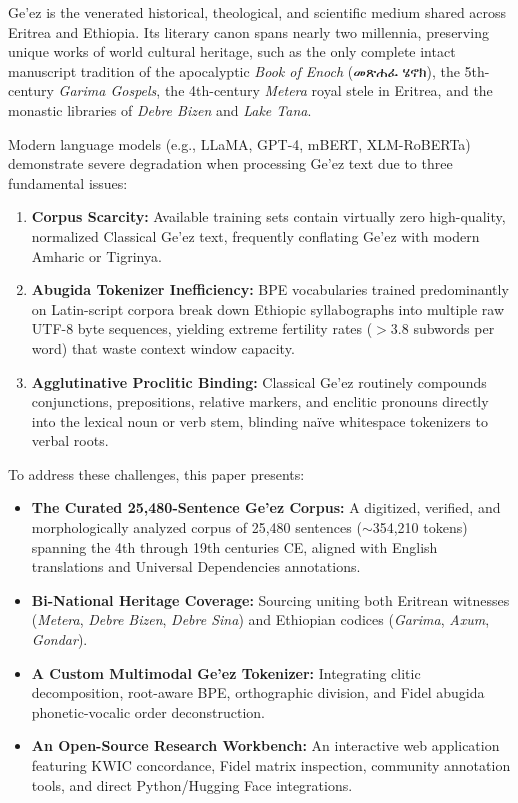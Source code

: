 \documentclass[11pt,a4paper]{article}
\begin{document}
Ge'ez is the venerated historical, theological, and scientific medium shared across Eritrea and Ethiopia. Its literary canon spans nearly two millennia, preserving unique works of world cultural heritage, such as the only complete intact manuscript tradition of the apocalyptic \textit{Book of Enoch} (መጽሐፈ ሄኖክ), the 5th-century \textit{Garima Gospels}, the 4th-century \textit{Metera} royal stele in Eritrea, and the monastic libraries of \textit{Debre Bizen} and \textit{Lake Tana}.

Modern language models (e.g., LLaMA, GPT-4, mBERT, XLM-RoBERTa) demonstrate severe degradation when processing Ge'ez text due to three fundamental issues:
\begin{enumerate}
    \item \textbf{Corpus Scarcity:} Available training sets contain virtually zero high-quality, normalized Classical Ge'ez text, frequently conflating Ge'ez with modern Amharic or Tigrinya.
    \item \textbf{Abugida Tokenizer Inefficiency:} BPE vocabularies trained predominantly on Latin-script corpora break down Ethiopic syllabographs into multiple raw UTF-8 byte sequences, yielding extreme fertility rates ($>3.8$ subwords per word) that waste context window capacity.
    \item \textbf{Agglutinative Proclitic Binding:} Classical Ge'ez routinely compounds conjunctions, prepositions, relative markers, and enclitic pronouns directly into the lexical noun or verb stem, blinding naïve whitespace tokenizers to verbal roots.
\end{enumerate}

To address these challenges, this paper presents:
\begin{itemize}
    \item \textbf{The Curated 25,480-Sentence Ge'ez Corpus:} A digitized, verified, and morphologically analyzed corpus of 25,480 sentences ($\sim$354,210 tokens) spanning the 4th through 19th centuries CE, aligned with English translations and Universal Dependencies annotations.
    \item \textbf{Bi-National Heritage Coverage:} Sourcing uniting both Eritrean witnesses (\textit{Metera}, \textit{Debre Bizen}, \textit{Debre Sina}) and Ethiopian codices (\textit{Garima}, \textit{Axum}, \textit{Gondar}).
    \item \textbf{A Custom Multimodal Ge'ez Tokenizer:} Integrating clitic decomposition, root-aware BPE, orthographic division, and Fidel abugida phonetic-vocalic order deconstruction.
    \item \textbf{An Open-Source Research Workbench:} An interactive web application featuring KWIC concordance, Fidel matrix inspection, community annotation tools, and direct Python/Hugging Face integrations.
\end{itemize}
\end{document}
